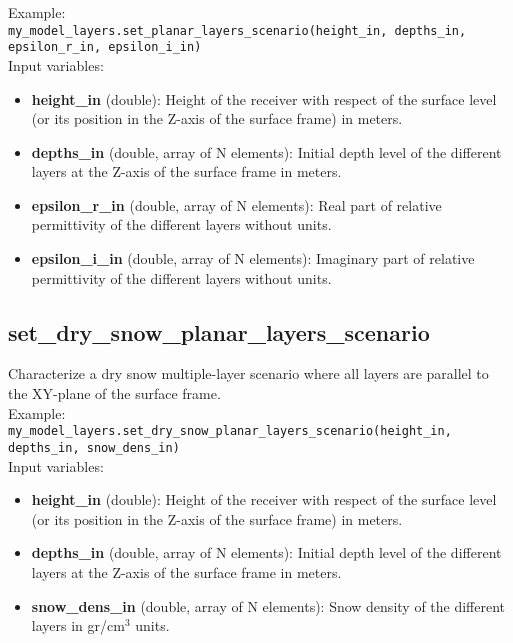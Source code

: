 Example:\\

\texttt{my\_model\_layers.set\_planar\_layers\_scenario(height\_in, depths\_in, epsilon\_r\_in, epsilon\_i\_in)}\\

Input variables:
\begin{itemize}
\item {\bf height\_in} (double): Height of the receiver with respect of the surface level (or its position in the Z-axis of the surface frame) in meters.
\item {\bf depths\_in} (double, array of N elements): Initial depth level of the different layers at the Z-axis of the surface frame in meters.
\item {\bf epsilon\_r\_in} (double, array of N elements): Real part of relative permittivity of the different layers without units.
\item {\bf epsilon\_i\_in} (double, array of N elements): Imaginary part of relative permittivity of the different layers without units.
\end{itemize}


\subsection{set\_dry\_snow\_planar\_layers\_scenario}

Characterize a dry snow multiple-layer scenario where all layers are parallel to the XY-plane of the surface frame.\\

Example:\\

\texttt{my\_model\_layers.set\_dry\_snow\_planar\_layers\_scenario(height\_in, depths\_in, snow\_dens\_in)}\\

Input variables:
\begin{itemize}
\item {\bf height\_in} (double): Height of the receiver with respect of the surface level (or its position in the Z-axis of the surface frame) in meters.
\item {\bf depths\_in} (double, array of N elements): Initial depth level of the different layers at the Z-axis of the surface frame in meters.
\item {\bf snow\_dens\_in} (double, array of N elements): Snow density of the different layers in gr/cm$^3$ units.
\end{itemize}


